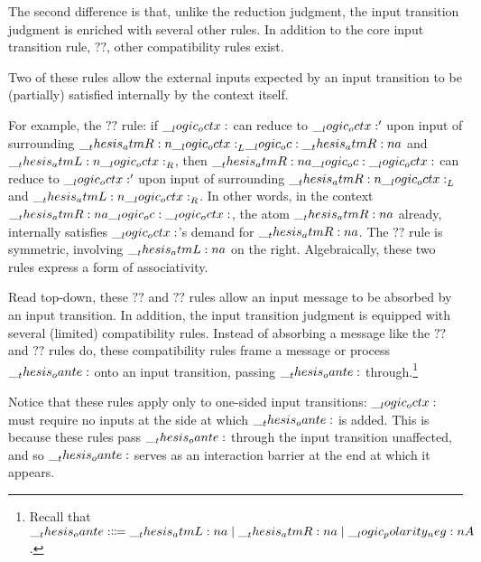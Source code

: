 The second difference is that, unlike the reduction judgment, the input transition judgment is enriched with several other rules.
In addition to the core input transition rule, $??$, other compatibility rules exist.

Two of these rules allow the external inputs expected by an input transition to be (partially) satisfied internally by the context itself.
For example, the $??$ rule: if $\__logic_octx:$ can reduce to $\__logic_octx:'$ upon input of surrounding $\__thesis_atmR:n {\__logic_octx:}_L \__logic_oc: \__thesis_atmR:n {a}$ and $\__thesis_atmL:n {\__logic_octx:}_R$, then $\__thesis_atmR:n {a} \__logic_oc: \__logic_octx:$ can reduce to $\__logic_octx:'$ upon input of surrounding $\__thesis_atmR:n {\__logic_octx:}_L$ and $\__thesis_atmL:n {\__logic_octx:}_R$.
In other words, in the context $\__thesis_atmR:n {a} \__logic_oc: \__logic_octx:$, the atom $\__thesis_atmR:n {a}$ already, internally satisfies $\__logic_octx:$'s demand for $\__thesis_atmR:n {a}$.
The $??$ rule is symmetric, involving $\__thesis_atmL:n {a}$ on the right.
Algebraically, these two rules express a form of associativity.



Read top-down, these $??$ and $??$ rules allow an input message to be absorbed by an input transition.
In addition, the input transition judgment is equipped with several (limited) compatibility rules.
Instead of absorbing a message like the $??$ and $??$ rules do, these compatibility rules frame a message or process $\__thesis_oante:$ onto an input transition, passing $\__thesis_oante:$ through.\footnote{Recall that $\__thesis_oante: \Coloneqq \__thesis_atmL:n {a} \mid \__thesis_atmR:n {a} \mid \__logic_polarity_neg:n {A}$.}
Notice that these rules apply only to one-sided input transitions: $\__logic_octx:$ must require no inputs at the side at which $\__thesis_oante:$ is added.
This is because these rules pass $\__thesis_oante:$ through the input transition unaffected, and so $\__thesis_oante:$ serves as an interaction barrier at the end at which it appears.

